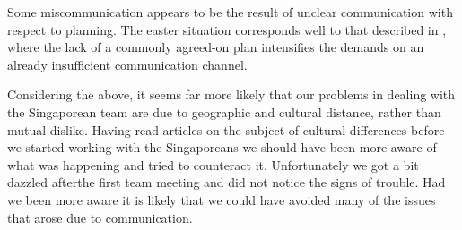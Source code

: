 Some miscommunication appears to be the result of unclear communication with
respect to planning. The easter situation corresponds well to that described in
\cite[sec.~3.1.2]{herbsiemens}, where the lack of a commonly agreed-on plan
intensifies the demands on an already insufficient communication channel.

Considering the above, it seems far more likely that our problems in dealing
with the Singaporean team are due to geographic and cultural distance, rather
than mutual dislike. Having read articles on the subject of cultural differences
 before we started working with the Singaporeans we should have been more
 aware of what was happening and tried to counteract it. Unfortunately we 
got a bit dazzled afterthe first team meeting and did not notice the signs of trouble. 
Had we been more aware it is likely that we could have avoided many of the
 issues that arose due to communication.
